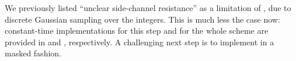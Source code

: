 \medskip

We previously listed ``unclear side-channel resistance'' as a limitation of \falcon, due to discrete Gaussian sampling over the integers. This is much less the case now: constant-time implementations for this step and for the whole scheme are provided in \cite{PQCRYPTO:HPRR20} and \cite{EPRINT:Pornin19}, respectively. A challenging next step is to implement \falcon in a masked fashion.
